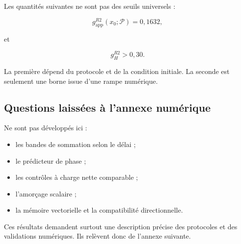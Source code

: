 Les quantités suivantes ne sont pas des seuils universels :

\[
g_{\mathrm{app}}^{R2}
(x_0;\mathcal P)
=
0{,}1632,
\]

et

\[
g_H^{R2}>0{,}30.
\]

La première dépend du protocole et de la condition initiale. La seconde
est seulement une borne issue d'une rampe numérique.

\subsection{Questions laissées à l'annexe numérique}

Ne sont pas développés ici :

\begin{itemize}
\item
  les bandes de sommation selon le délai ;
\item
  le prédicteur de phase ;
\item
  les contrôles à charge nette comparable ;
\item
  l'amorçage scalaire ;
\item
  la mémoire vectorielle et la compatibilité directionnelle.
\end{itemize}

Ces résultats demandent surtout une description précise des protocoles
et des validations numériques. Ils relèvent donc de l'annexe suivante.

